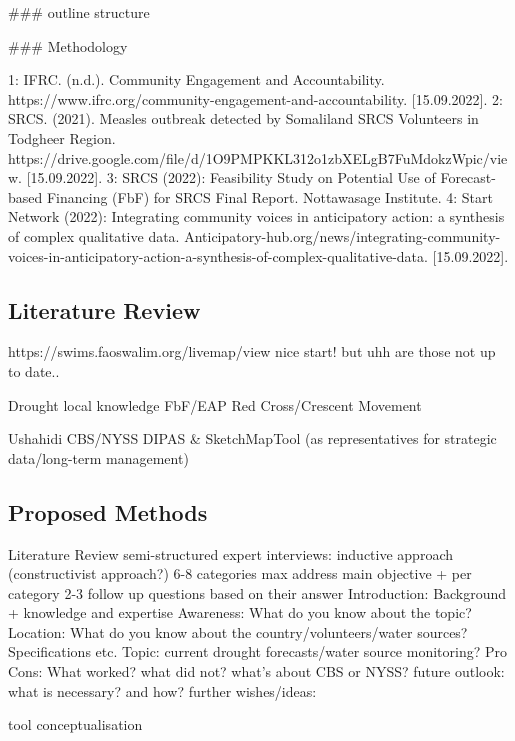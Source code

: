 \#\#\# outline structure


\#\#\# Methodology



1: IFRC. (n.d.). Community Engagement and Accountability. https://www.ifrc.org/community-engagement-and-accountability. [15.09.2022].
2: SRCS. (2021). Measles outbreak detected by Somaliland SRCS Volunteers in Todgheer Region. https://drive.google.com/file/d/1O9PMPKKL312o1zbXELgB7FuMdokzWpic/view. [15.09.2022].
3: SRCS (2022): Feasibility Study on Potential Use of Forecast-based Financing (FbF) for SRCS Final Report. Nottawasage Institute.
4: Start Network (2022): Integrating community voices in anticipatory action: a synthesis of complex qualitative data. Anticipatory-hub.org/news/integrating-community-voices-in-anticipatory-action-a-synthesis-of-complex-qualitative-data. [15.09.2022].


\subsection{Literature Review}
https://swims.faoswalim.org/livemap/view nice start! but uhh are those not up to date..

Drought
local knowledge
FbF/EAP
Red Cross/Crescent Movement

Ushahidi
CBS/NYSS
DIPAS \& SketchMapTool (as representatives for strategic data/long-term management)


\subsection{Proposed Methods}

Literature Review
semi-structured expert interviews: inductive approach (constructivist approach?)
6-8 categories max
address main objective + per category 2-3 follow up questions based on their answer
Introduction: Background + knowledge and expertise
Awareness: What do you know about the topic?
Location: What do you know about the country/volunteers/water sources? Specifications etc.
Topic: current drought forecasts/water source monitoring?
Pro Cons: What worked? what did not? what's about CBS or NYSS?
future outlook: what is necessary? and how?
further wishes/ideas:

tool conceptualisation



